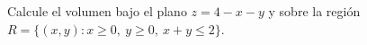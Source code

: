 Calcule el volumen bajo el plano $z=4-x-y$ y sobre la región $R=\{(x,y):x\geq0,\ y\geq0,\ x+y\leq2\}$.

